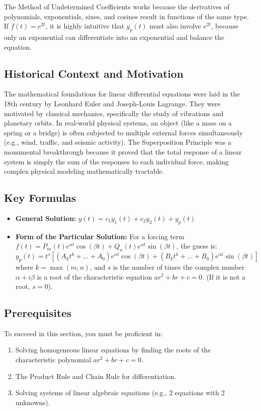 \documentclass[12pt]{article}
\begin{document}
The Method of Undetermined Coefficients works because the derivatives of polynomials, exponentials, sines, and cosines result in functions of the same type. If $f(t) = e^{2t}$, it is highly intuitive that $y_p(t)$ must also involve $e^{2t}$, because only an exponential can differentiate into an exponential and balance the equation.

\subsection{Historical Context and Motivation}
The mathematical foundations for linear differential equations were laid in the 18th century by Leonhard Euler and Joseph-Louis Lagrange. They were motivated by classical mechanics, specifically the study of vibrations and planetary orbits. In real-world physical systems, an object (like a mass on a spring or a bridge) is often subjected to multiple external forces simultaneously (e.g., wind, traffic, and seismic activity). The Superposition Principle was a monumental breakthrough because it proved that the total response of a linear system is simply the sum of the responses to each individual force, making complex physical modeling mathematically tractable.

\subsection{Key Formulas}
\begin{itemize}
    \item \textbf{General Solution:} $y(t) = c_1 y_1(t) + c_2 y_2(t) + y_p(t)$
    \item \textbf{Form of the Particular Solution:} For a forcing term $f(t) = P_m(t) e^{\alpha t} \cos(\beta t) + Q_n(t) e^{\alpha t} \sin(\beta t)$, the guess is:
    \[ y_p(t) = t^s \left[ (A_k t^k + \dots + A_0) e^{\alpha t} \cos(\beta t) + (B_k t^k + \dots + B_0) e^{\alpha t} \sin(\beta t) \right] \]
    where $k = \max(m, n)$, and $s$ is the number of times the complex number $\alpha + i\beta$ is a root of the characteristic equation $a r^2 + b r + c = 0$. (If it is not a root, $s=0$).
\end{itemize}

\subsection{Prerequisites}
To succeed in this section, you must be proficient in:
\begin{enumerate}
    \item Solving homogeneous linear equations by finding the roots of the characteristic polynomial $a r^2 + b r + c = 0$.
    \item The Product Rule and Chain Rule for differentiation.
    \item Solving systems of linear algebraic equations (e.g., 2 equations with 2 unknowns).
\end{enumerate}
\end{document}
